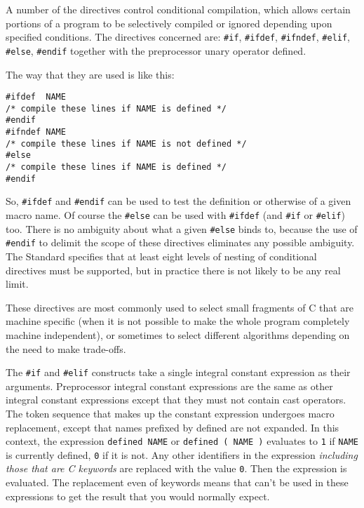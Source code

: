    A number of the directives control conditional compilation, which
    allows certain portions of a program to be selectively compiled or
    ignored depending upon specified conditions. The directives concerned
    are: \texttt{\#if}, \texttt{\#ifdef}, \texttt{\#ifndef},
    \texttt{\#elif}, \texttt{\#else}, \texttt{\#endif} together
    with the preprocessor unary operator defined.


   The way that they are used is like this:


   \begin{Verbatim}
#ifdef  NAME
/* compile these lines if NAME is defined */
#endif
#ifndef NAME
/* compile these lines if NAME is not defined */
#else
/* compile these lines if NAME is defined */
#endif
\end{Verbatim}

   So, \texttt{\#ifdef} and \texttt{\#endif} can be used to test
    the definition or otherwise of a given macro name. Of course the
    \texttt{\#else} can be used with \texttt{\#ifdef} (and
    \texttt{\#if} or \texttt{\#elif}) too. There is no ambiguity about
    what a given \texttt{\#else} binds to, because the use of
    \texttt{\#endif} to delimit the scope of these directives eliminates
    any possible ambiguity. The Standard specifies that at least eight
    levels of nesting of conditional directives must be supported, but in
    practice there is not likely to be any real limit.


   These directives are most commonly used to select small fragments of
    C that are machine specific (when it is not possible to make the whole
    program completely machine independent), or sometimes to select
    different algorithms depending on the need to make trade-offs.


   The \texttt{\#if} and \texttt{\#elif} constructs take a single
    integral constant expression as their arguments. Preprocessor integral
    constant expressions are the same as other integral constant expressions
    except that they must not contain cast operators. The token sequence
    that makes up the constant expression undergoes macro replacement,
    except that names prefixed by defined are not expanded. In this context,
    the expression \texttt{defined NAME} or \texttt{defined ( NAME
    )} evaluates to \texttt{1} if \texttt{NAME} is currently
    defined, \texttt{0} if it is not. Any other identifiers in the
    expression \textit{including those that are C keywords} are replaced
    with the value \texttt{0}. Then the expression is evaluated. The
    replacement even of keywords means that \sizeof{} can't be
    used in these expressions to get the result that you would normally
    expect.


